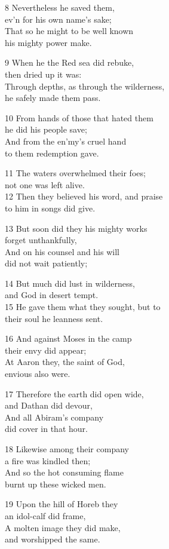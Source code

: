 8 Nevertheless he saved them,\\
ev’n for his own name’s sake;\\
That so he might to be well known\\
his mighty power make.

9 When he the Red sea did rebuke,\\
then dried up it was:\\
Through depths, as through the wilderness,\\
he safely made them pass.

10 From hands of those that hated them\\
he did his people save;\\
And from the en’my’s cruel hand\\
to them redemption gave.

11 The waters overwhelmed their foes;\\
not one was left alive.\\
12 Then they believed his word, and praise\\
to him in songs did give.

13 But soon did they his mighty works\\
forget unthankfully,\\
And on his counsel and his will\\
did not wait patiently;

14 But much did lust in wilderness,\\
and God in desert tempt.\\
15 He gave them what they sought, but to\\
their soul he leanness sent.

16 And against Moses in the camp\\
their envy did appear;\\
At Aaron they, the saint of God,\\
envious also were.

17 Therefore the earth did open wide,\\
and Dathan did devour,\\
And all Abiram’s company\\
did cover in that hour.

18 Likewise among their company\\
a fire was kindled then;\\
And so the hot consuming flame\\
burnt up these wicked men.

19 Upon the hill of Horeb they\\
an idol-calf did frame,\\
A molten image they did make,\\
and worshipped the same.

